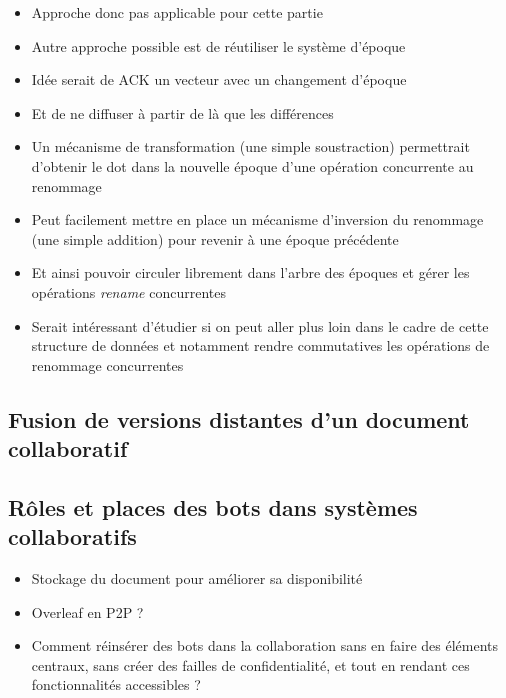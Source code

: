 \documentclass[12pt]{thesul}
\begin{document}
\begin{itemize}
  \item Approche donc pas applicable pour cette partie
  \item Autre approche possible est de réutiliser le système d'époque
  \item Idée serait de ACK un vecteur avec un changement d'époque
  \item Et de ne diffuser à partir de là que les différences
  \item Un mécanisme de transformation (une simple soustraction) permettrait d'obtenir le dot dans la nouvelle époque d'une opération concurrente au renommage
  \item Peut facilement mettre en place un mécanisme d'inversion du renommage (une simple addition) pour revenir à une époque précédente
  \item Et ainsi pouvoir circuler librement dans l'arbre des époques et gérer les opérations \emph{rename} concurrentes
  \item Serait intéressant d'étudier si on peut aller plus loin dans le cadre de cette structure de données et notamment rendre commutatives les opérations de renommage concurrentes
\end{itemize}

\subsection{Fusion de versions distantes d'un document collaboratif}

\subsection{Rôles et places des bots dans systèmes collaboratifs}
\begin{itemize}
  \item Stockage du document pour améliorer sa disponibilité
  \item Overleaf en P2P ?
  \item Comment réinsérer des bots dans la collaboration sans en faire des éléments centraux, sans créer des failles de confidentialité, et tout en rendant ces fonctionnalités accessibles ?
\end{itemize}


\label{app:rename-id}
\end{document}
